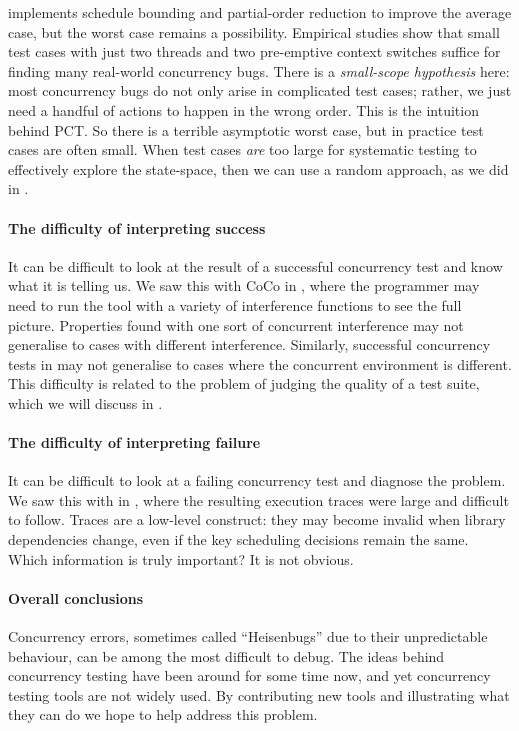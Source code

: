 \dejafu{} implements schedule
bounding\cite{emmi2011,musuvathi2008,musuvathi2007} and partial-order
reduction\cite{flanagan2005,godefroid1996} to improve the average
case, but the worst case remains a possibility.  Empirical studies
show that small test cases with just two threads and two pre-emptive
context switches suffice for finding many real-world concurrency
bugs\cite{thomson2014}.  There is a \emph{small-scope hypothesis}
here: most concurrency bugs do not only arise in complicated test
cases; rather, we just need a handful of actions to happen in the
wrong order.  This is the intuition behind PCT\cite{burckhardt2010}.
So there is a terrible asymptotic worst case, but in practice test
cases are often small.  When test cases \emph{are} too large for
systematic testing to effectively explore the state-space, then we can
use a random approach, as we did in .

\paragraph{The difficulty of interpreting success}
It can be difficult to look at the result of a successful concurrency
test and know what it is telling us.  We saw this with CoCo in
, where the programmer may need to run the tool
with a variety of interference functions to see the full picture.
Properties found with one sort of concurrent interference may not
generalise to cases with different interference.  Similarly,
successful concurrency tests in \dejafu{} may not generalise to cases
where the concurrent environment is different.  This difficulty is
related to the problem of judging the quality of a test suite, which
we will discuss in .

\paragraph{The difficulty of interpreting failure}
It can be difficult to look at a failing concurrency test and diagnose
the problem.  We saw this with \dejafu{} in
, where the resulting execution
traces were large and difficult to follow.  Traces are a low-level
construct: they may become invalid when library dependencies change,
even if the key scheduling decisions remain the same.  Which
information is truly important?  It is not obvious.

\paragraph{Overall conclusions}
Concurrency errors, sometimes called ``Heisenbugs'' due to their
unpredictable behaviour, can be among the most difficult to
debug\cite{musuvathi2008osdi}.  The ideas behind concurrency testing
have been around for some time now\cite{godefroid1996}, and yet
concurrency testing tools are not widely used.  By contributing new
tools and illustrating what they can do we hope to help address this
problem.
